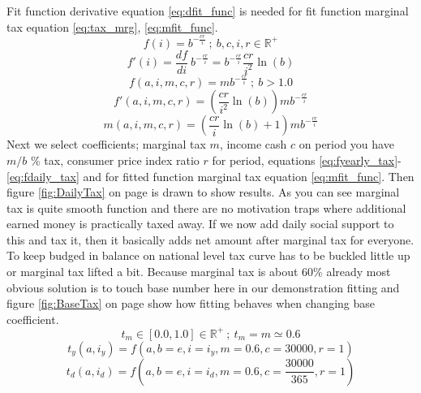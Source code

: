 Fit function derivative equation \ref{eq:dfit_func} is needed for
fit function marginal tax equation \ref{eq:tax_mrg}, \ref{eq:mfit_func}.
\begin{equation} \label{eq:fit_simp}
 f(i) = b^{-\frac{cr}i} ~;~ b,c,i,r \in \mathbb{R}^+
\end{equation}
\begin{equation} \label{eq:fit_deri}
 f'(i) = \frac{df}{di}~b^{-\frac{cr}i} = b^{-\frac{cr}i} \frac{cr}{i^2}\ln(b) 
\end{equation}
\begin{equation} \label{eq:fit_func}
 f(a,i,m,c,r) = m b^{-\frac{cr}i} ~;~ b > 1.0
\end{equation}
\begin{equation} \label{eq:dfit_func}
 f'(a,i,m,c,r) = \left(\frac{cr}{i^2}\ln(b)\right) m b^{-\frac{cr}i}
\end{equation}
\begin{equation} \label{eq:mfit_func}
 m(a,i,m,c,r) = \left(\frac{cr}i\ln(b)+1\right) m b^{-\frac{cr}i}
\end{equation}
Next we select coefficients; marginal tax $m$, income cash $c$ on period you have $m/b$ \% tax,
consumer price index ratio $r$ for period, equations \ref{eq:fyearly_tax}-\ref{eq:fdaily_tax}
and for fitted function marginal tax equation \ref{eq:mfit_func}.
Then figure \ref{fig:DailyTax} on page \pageref{fig:DailyTax} is drawn to show results.
As you can see marginal tax is quite smooth function
and there are no motivation traps where additional earned money is practically taxed away.
If we now add daily social support to this and tax it,
then it basically adds net amount after marginal tax for everyone.
To keep budged in balance on national level
tax curve has to be buckled little up or marginal tax lifted a bit.
Because marginal tax is about 60\% already
most obvious solution is to touch base number here in our demonstration fitting
and figure \ref{fig:BaseTax} on page \pageref{fig:BaseTax}
show how fitting behaves when changing base coefficient.
\begin{equation} \label{eq:tax_max}
t_m \in [0.0,1.0] \in \mathbb{R}^+ ~;~ t_m = m \simeq 0.6
\end{equation}
\begin{equation} \label{eq:fyearly_tax}
t_y(a,i_y)=f(a,b=e,i=i_y,m=0.6,c=30000,r=1)
\end{equation}
\begin{equation} \label{eq:fdaily_tax}
t_d(a,i_d)=f(a,b=e,i=i_d,m=0.6,c=\frac{30000}{365},r=1)
\end{equation}
